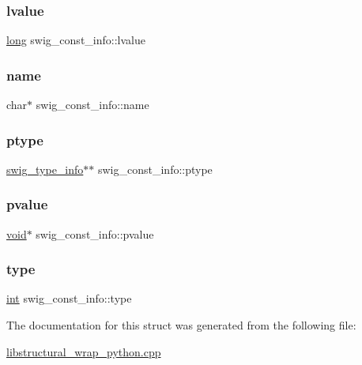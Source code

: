 \subsubsection{\texorpdfstring{lvalue}{lvalue}}
{\footnotesize\ttfamily \hyperlink{lp__lib_8h_ad3500e0f98a49bb08992451a297ce6a6}{long} swig\+\_\+const\+\_\+info\+::lvalue}

\mbox{\label{structswig__const__info_aad383d74116313cf9a8532e163368050}} 
\subsubsection{\texorpdfstring{name}{name}}
{\footnotesize\ttfamily char$\ast$ swig\+\_\+const\+\_\+info\+::name}

\mbox{\label{structswig__const__info_aedd46d173c5b5ed4ee60ad5660233557}} 
\subsubsection{\texorpdfstring{ptype}{ptype}}
{\footnotesize\ttfamily \hyperlink{structswig__type__info}{swig\+\_\+type\+\_\+info}$\ast$$\ast$ swig\+\_\+const\+\_\+info\+::ptype}

\mbox{\label{structswig__const__info_abbc43512c364bff11fac5961c1155090}} 
\subsubsection{\texorpdfstring{pvalue}{pvalue}}
{\footnotesize\ttfamily \hyperlink{lp__lib_8h_ac7828c7b2b31d2e11af17bdb6289c5d9}{void}$\ast$ swig\+\_\+const\+\_\+info\+::pvalue}

\mbox{\label{structswig__const__info_ae8bbc99e1cda11f24e306365cbf33893}} 
\subsubsection{\texorpdfstring{type}{type}}
{\footnotesize\ttfamily \hyperlink{lp__lib_8h_adeb9ec6400320e4923ac9d836d509ddb}{int} swig\+\_\+const\+\_\+info\+::type}



The documentation for this struct was generated from the following file\+:\begin{DoxyCompactItemize}
\item 
\hyperlink{libstructural__wrap__python_8cpp}{libstructural\+\_\+wrap\+\_\+python.\+cpp}\end{DoxyCompactItemize}
